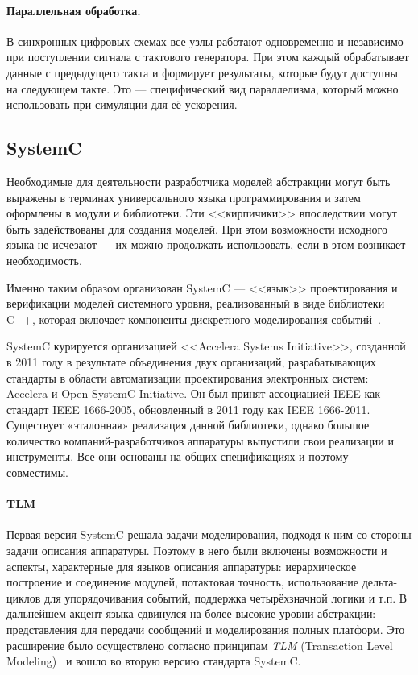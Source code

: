 \paragraph{Параллельная обработка.} В синхронных цифровых схемах все узлы работают одновременно и независимо при поступлении сигнала с тактового генератора. При этом каждый обрабатывает данные с предыдущего такта и формирует результаты, которые будут доступны на следующем такте. Это --- специфический вид параллелизма, который можно использовать при симуляции для её ускорения.

\subsection{SystemC}

Необходимые для деятельности разработчика моделей абстракции могут быть выражены в терминах универсального языка программирования и затем оформлены в модули и библиотеки. Эти <<кирпичики>> впоследствии могут быть задействованы для создания моделей. При этом возможности исходного языка не исчезают --- их можно продолжать использовать, если в этом возникает необходимость.

Именно таким образом организован SystemC --- <<язык>> проектирования и верификации моделей системного уровня, реализованный в виде библиотеки C++, которая включает компоненты дискретного моделирования событий~\cite{systemc2006}. 

SystemC курируется организацией <<Accelera Systems Initiative>>, созданной в 2011 году в результате объединения двух организаций, разрабатывающих стандарты в области автоматизации проектирования электронных систем: Accelera и Open SystemC Initiative. Он был принят ассоциацией IEEE как стандарт IEEE 1666-2005, обновленный в 2011 году как IEEE 1666-2011. Существует «эталонная» реализация данной библиотеки, однако большое количество компаний-разработчиков аппаратуры  выпустили свои реализации и инструменты. Все они основаны на общих спецификациях и поэтому совместимы.

\paragraph{TLM} Первая версия SystemC решала задачи моделирования, подходя к ним со стороны задачи описания аппаратуры. Поэтому в него были включены возможности и аспекты, характерные для языков описания аппаратуры: иерархическое построение и соединение модулей, потактовая точность, использование дельта-циклов для упорядочивания событий, поддержка четырёхзначной логики и т.п.
В дальнейшем акцент языка сдвинулся на более высокие уровни абстракции: представления для передачи сообщений и моделирования полных платформ. Это расширение было осуществлено согласно принципам \textit{TLM} (\abbr Transaction Level Modeling)~\cite{tlm2003} и вошло во вторую версию стандарта SystemC. 

